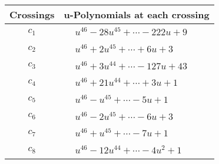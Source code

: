 \documentclass[1p]{elsarticle_modified}
\theoremstyle{definition}
\begin{document}
\begin{tabular}{m{50pt}|m{274pt}}
Crossings & \hspace{64pt}u-Polynomials at each crossing \\
\hline $$\begin{aligned}c_{1}\end{aligned}$$&$\begin{aligned}
&u^{46}-28 u^{45}+\cdots-222 u+9
\end{aligned}$\\
\hline $$\begin{aligned}c_{2}\end{aligned}$$&$\begin{aligned}
&u^{46}+2 u^{45}+\cdots+6 u+3
\end{aligned}$\\
\hline $$\begin{aligned}c_{3}\end{aligned}$$&$\begin{aligned}
&u^{46}+3 u^{44}+\cdots-127 u+43
\end{aligned}$\\
\hline $$\begin{aligned}c_{4}\end{aligned}$$&$\begin{aligned}
&u^{46}+21 u^{44}+\cdots+3 u+1
\end{aligned}$\\
\hline $$\begin{aligned}c_{5}\end{aligned}$$&$\begin{aligned}
&u^{46}- u^{45}+\cdots-5 u+1
\end{aligned}$\\
\hline $$\begin{aligned}c_{6}\end{aligned}$$&$\begin{aligned}
&u^{46}-2 u^{45}+\cdots-6 u+3
\end{aligned}$\\
\hline $$\begin{aligned}c_{7}\end{aligned}$$&$\begin{aligned}
&u^{46}+u^{45}+\cdots-7 u+1
\end{aligned}$\\
\hline $$\begin{aligned}c_{8}\end{aligned}$$&$\begin{aligned}
&u^{46}-12 u^{44}+\cdots-4 u^2+1
\end{aligned}$\\

\end{tabular}
\end{document}
